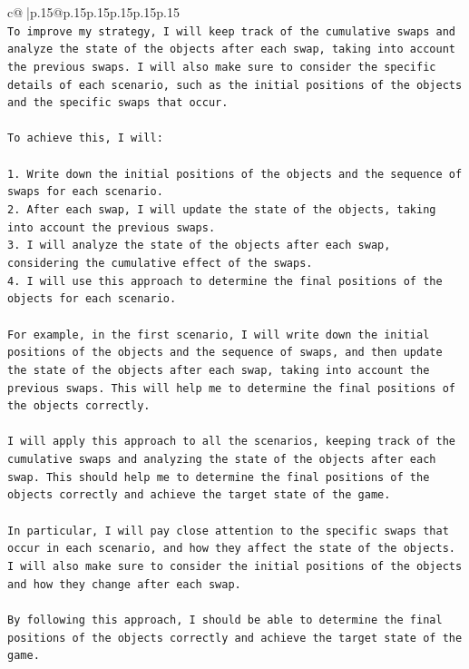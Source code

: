 \documentclass{article}
\begin{document}
{\begin{supertabular}{c@{$\;$}|p{.15\linewidth}@{}p{.15\linewidth}p{.15\linewidth}p{.15\linewidth}p{.15\linewidth}p{.15\linewidth}}
{{{\\ 
\texttt{To improve my strategy, I will keep track of the cumulative swaps and analyze the state of the objects after each swap, taking into account the previous swaps. I will also make sure to consider the specific details of each scenario, such as the initial positions of the objects and the specific swaps that occur.} \\
\\ 
\texttt{To achieve this, I will:} \\
\\ 
\texttt{1. Write down the initial positions of the objects and the sequence of swaps for each scenario.} \\
\texttt{2. After each swap, I will update the state of the objects, taking into account the previous swaps.} \\
\texttt{3. I will analyze the state of the objects after each swap, considering the cumulative effect of the swaps.} \\
\texttt{4. I will use this approach to determine the final positions of the objects for each scenario.} \\
\\ 
\texttt{For example, in the first scenario, I will write down the initial positions of the objects and the sequence of swaps, and then update the state of the objects after each swap, taking into account the previous swaps. This will help me to determine the final positions of the objects correctly.} \\
\\ 
\texttt{I will apply this approach to all the scenarios, keeping track of the cumulative swaps and analyzing the state of the objects after each swap. This should help me to determine the final positions of the objects correctly and achieve the target state of the game.} \\
\\ 
\texttt{In particular, I will pay close attention to the specific swaps that occur in each scenario, and how they affect the state of the objects. I will also make sure to consider the initial positions of the objects and how they change after each swap.} \\
\\ 
\texttt{By following this approach, I should be able to determine the final positions of the objects correctly and achieve the target state of the game.} \\
\\ 
\\ 
}}}
\end{supertabular}}
\end{document}
